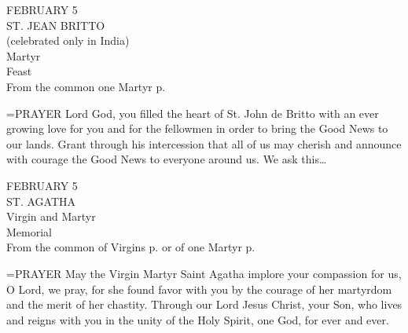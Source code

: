 \begin{center}\normalsize FEBRUARY 5\\
\footnotesize ST. JEAN BRITTO\\
\footnotesize (celebrated only in India)\\
\footnotesize Martyr\\
\footnotesize Feast\\
\footnotesize From the common one Martyr p. \\
\end{center}

\hangindent=\parindent \small{PRAYER 
Lord God, you filled the heart of St. John de Britto with an
ever growing love for you and for the fellowmen in order to bring
the Good News to our lands. Grant through his intercession that
all of us may cherish and announce with courage the Good News to
everyone around us. We ask this…\\}
 
\begin{center}\normalsize FEBRUARY 5\\
\footnotesize ST. AGATHA\\
\footnotesize Virgin and Martyr\\
\footnotesize Memorial\\
\footnotesize From the common of Virgins p.   or of one Martyr p.  \\
\end{center}

\hangindent=\parindent \small{PRAYER 
May the Virgin Martyr Saint Agatha
implore your compassion for us, O Lord, we pray,
for she found favor with you
by the courage of her martyrdom
and the merit of her chastity.
Through our Lord Jesus Christ, your Son,
who lives and reigns with you in the unity of the Holy Spirit,
one God, for ever and ever.\\}
 

